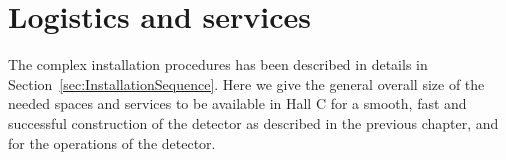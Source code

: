\newpage

\section{Logistics and services}
\label{sec:TechnicalDesign}



The complex installation procedures has been described in details in Section~\ref{sec:InstallationSequence}. Here we give the general overall size of the needed spaces and services to be available in Hall C for a smooth, fast and successful construction of the \DSks detector as described in the previous chapter, and for the operations of the detector.

